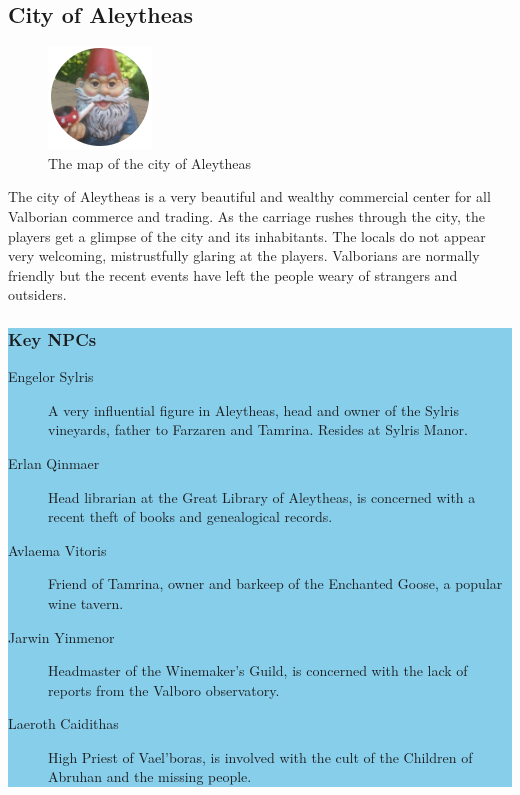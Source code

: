 \begin{multicols*}{2}
\subsection*{City of Aleytheas}

\begin{figure}
	\centering
	\includegraphics[]{images/placeholder}
	\caption{The map of the city of Aleytheas}
\end{figure}

The city of Aleytheas is a very beautiful and wealthy commercial center for all Valborian commerce and trading. As the carriage rushes through the city, the players get a glimpse of the city and its inhabitants. The locals do not appear very welcoming, mistrustfully glaring at the players. Valborians are normally friendly but the recent events have left the people weary of strangers and outsiders.
\break

\colorbox{SkyBlue}{\begin{minipage}{0.4\textwidth}
\subsubsection*{Key NPCs}
\begin{description}
	\item[Engelor Sylris] A very influential figure in Aleytheas, head and owner of the Sylris vineyards, father to Farzaren and Tamrina. Resides at Sylris Manor.
	\item[Erlan Qinmaer] Head librarian at the Great Library of Aleytheas, is concerned with a recent theft of books and genealogical records.
	\item[Avlaema Vitoris] Friend of Tamrina, owner and barkeep of the Enchanted Goose, a popular wine tavern.
	\item[Jarwin Yinmenor] Headmaster of the Winemaker's Guild, is concerned with the lack of reports from the Valboro observatory.
	\item[Laeroth Caidithas] High Priest of Vael'boras, is involved with the cult of the Children of Abruhan and the missing people.
\end{description} 
\end{minipage}}
\break


\end{multicols*}
